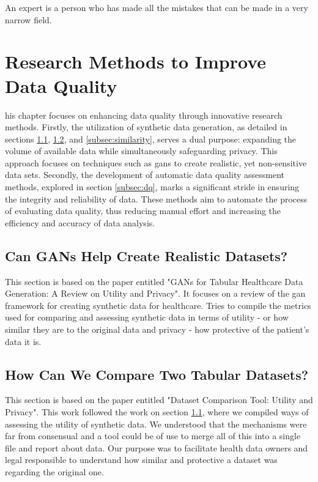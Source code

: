 
\begin{savequote}[75mm]
An expert is a person who has made all the mistakes that can be made in a very narrow field.
    \end{savequote}


\chapter{Research Methods to Improve Data Quality}\label{chap:goal1}

his chapter focuses on enhancing data quality through innovative research methods. Firstly, the utilization of synthetic data generation, as detailed in sections \ref{subsec:gans}, \ref{subsec:tabular}, and \ref{subsec:similarity}, serves a dual purpose: expanding the volume of available data while simultaneously safeguarding privacy. This approach focuses on  techniques such as \acp{gan} to create realistic, yet non-sensitive data sets. Secondly, the development of automatic data quality assessment methods, explored in section \ref{subsec:dq}, marks a significant stride in ensuring the integrity and reliability of data. These methods aim to automate the process of evaluating data quality, thus reducing manual effort and increasing the efficiency and accuracy of data analysis.



\section{Can GANs Help Create Realistic Datasets?}\label{subsec:gans}
This section is based on the paper entitled "GANs for Tabular Healthcare Data Generation: A Review on Utility and Privacy". It focuses on a review of the \ac{gan} framework for creating synthetic data for healthcare. Tries to compile the metrics used for comparing and assessing synthetic data in terms of utility - or how similar they are to the original data and privacy - how protective of the patient's data it is. 



\section{How Can We Compare Two Tabular Datasets?}\label{subsec:tabular}
This section is based on the paper entitled "Dataset Comparison Tool: Utility and Privacy". This work followed the work on section \ref{subsec:gans}, where we compiled ways of assessing the utility of synthetic data. We understood that the mechanisms were far from consensual and a tool could be of use to merge all of this into a single file and report about data. Our purpose was to facilitate health data owners and legal responsible to understand how similar and protective a dataset was regarding the original one.


